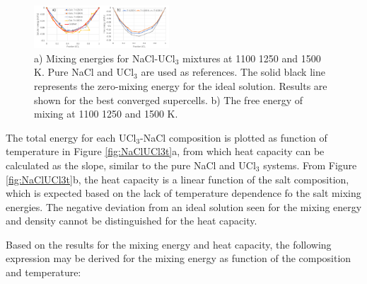 \documentclass[preprint,3p,10pt,twocolumn,number,sort&compress]{elsarticle}
\begin{document}

\begin{figure}[htb]
\centering
\includegraphics[width=0.45\textwidth]{./figures/FIG7.pdf}
\caption{a) Mixing energies for NaCl-UCl$_3$ mixtures at 1100 1250 and 1500 K. Pure NaCl and UCl$_3$ are used as references. The solid black line represents the zero-mixing energy for the ideal solution. %
Results are shown for the best converged supercells. b) The free energy of mixing at 1100 1250 and 1500 K.} 
\label{fig:NaClUCl3e}
\end{figure}

The total energy for each UCl$_3$-NaCl composition is plotted as function of temperature in Figure \ref{fig:NaClUCl3t}a, from which heat capacity can be calculated as the slope, similar to the pure NaCl and UCl$_3$ systems. From Figure \ref{fig:NaClUCl3t}b, the heat capacity is a linear function of the salt composition, which is expected based on the lack of temperature dependence fo the salt mixing energies. The negative deviation from an ideal solution seen for the mixing energy and density cannot be distinguished for the heat capacity. 

Based on the results for the mixing energy and heat capacity, the following expression may be derived for the mixing energy as function of the composition and temperature:
\begin{equation}
\end{equation}

\end{document}
